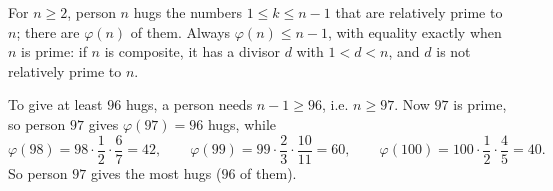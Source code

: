 For $n\ge2$, person $n$ hugs the numbers $1\le k\le n-1$ that are relatively prime to $n$; there are $\varphi(n)$ of them. Always $\varphi(n)\le n-1$, with equality exactly when $n$ is prime: if $n$ is composite, it has a divisor $d$ with $1<d<n$, and $d$ is not relatively prime to $n$.

To give at least $96$ hugs, a person needs $n-1\ge96$, i.e. $n\ge97$. Now $97$ is prime, so person $97$ gives $\varphi(97)=96$ hugs, while
\[\varphi(98)=98\cdot\dfrac12\cdot\dfrac67=42,\qquad\varphi(99)=99\cdot\dfrac23\cdot\dfrac{10}{11}=60,\qquad\varphi(100)=100\cdot\dfrac12\cdot\dfrac45=40.\]
So person $\boxed{97}$ gives the most hugs ($96$ of them).
